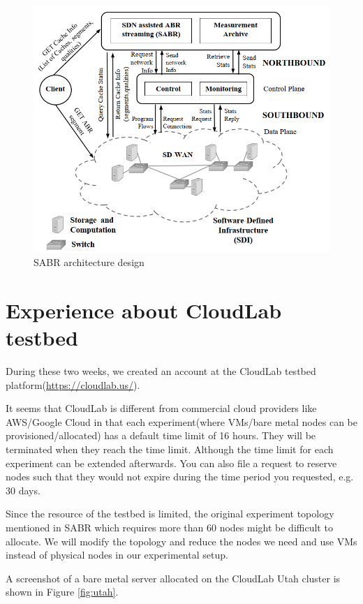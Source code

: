 \documentclass{article}
\begin{document}
\begin{figure}
\centering
\includegraphics[scale=0.5]{images/sabr-arch.png}
\caption{SABR architecture design}
\label{fig:sabr}
\end{figure}

\section{Experience about CloudLab testbed}
During these two weeks, we created an account at the CloudLab testbed platform(\url{https://cloudlab.us/}). 

It seems that CloudLab is different from commercial cloud providers like AWS/Google Cloud in that each experiment(where VMs/bare metal nodes can be provisioned/allocated) has a default time limit of 16 hours. They will be terminated when they reach the time limit. Although the time limit for each experiment can be extended afterwards. You can also file a request to reserve nodes such that they would not expire during the time period you requested, e.g. 30 days. 

Since the resource of the testbed is limited, the original experiment topology mentioned in SABR\cite{bhat_network_2017} which requires more than 60 nodes might be difficult to allocate. We will modify the topology and reduce the nodes we need and use VMs instead of physical nodes in our experimental setup.

A screenshot of a bare metal server allocated on the CloudLab Utah cluster is shown in Figure \ref{fig:utah}. 
\end{document}
